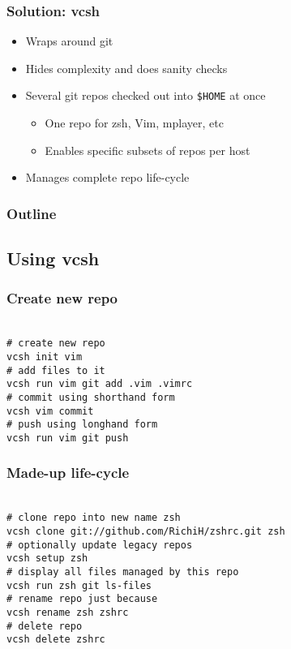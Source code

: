 \documentclass[t]{beamer}
\begin{document}
\begin{frame}
	\frametitle{Solution: vcsh}
	\begin{itemize}
		\item Wraps around git
		\item Hides complexity and does sanity checks
			\item Several git repos checked out into \texttt{\$HOME} at once
		\begin{itemize}
			\item One repo for zsh, Vim, mplayer, etc
			\item Enables specific subsets of repos per host
		\end{itemize}
		\item Manages complete repo life-cycle
	\end{itemize}
\end{frame}

\begin{frame}
	\frametitle{Outline}
	\tableofcontents[currentsection]
\end{frame}

\subsection{Using vcsh}

\begin{frame}
	\frametitle{Create new repo}
	\texttt{ \\
		\# create new repo \\
		vcsh init vim \\
		\# add files to it \\
		vcsh run vim git add .vim .vimrc \\
		\# commit using shorthand form \\
		vcsh vim commit \\
		\# push using longhand form \\
		vcsh run vim git push
	}
\end{frame}

\begin{frame}
	\frametitle{Made-up life-cycle}
	\texttt{ \\
		\# clone repo into new name zsh \\
		vcsh clone git://github.com/RichiH/zshrc.git zsh \\
		\# optionally update legacy repos \\
		vcsh setup zsh \\
		\# display all files managed by this repo \\
		vcsh run zsh git ls-files \\
		\# rename repo just because \\
		vcsh rename zsh zshrc \\
		\# delete repo \\
		vcsh delete zshrc
	}
\end{frame}
\end{document}
